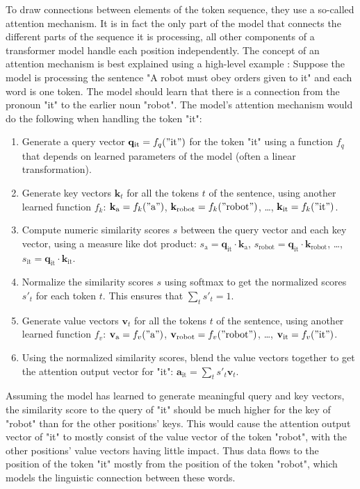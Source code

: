 To draw connections between elements of the token sequence, they use a so-called attention mechanism. It is in fact the only part of the model that connects the different parts of the sequence it is processing, all other components of a transformer model handle each position independently. The concept of an attention mechanism is best explained using a high-level example \cite{alammar-gpt2}: Suppose the model is processing the sentence "A robot must obey orders given to it" and each word is one token. The model should learn that there is a connection from the pronoun "it" to the earlier noun "robot".
The model's attention mechanism would do the following when handling the token "it":
\begin{enumerate}
	\item Generate a query vector $\mathbf{q}_{\mathrm{it}} = f_q("\mathrm{it}")$ for the token "it" using a function $f_q$ that depends on learned parameters of the model (often a linear transformation).
	\item Generate key vectors $\mathbf{k}_t$ for all the tokens $t$ of the sentence, using another learned function $f_k$: $\mathbf{k}_{\mathrm{a}} = f_k(\mathrm{"a"})$, $\mathbf{k}_{\mathrm{robot}} = f_k(\mathrm{"robot"})$, \ldots, $\mathbf{k}_{\mathrm{it}} = f_k(\mathrm{"it")}$.
	\item Compute numeric similarity scores $s$ between the query vector and each key vector, using a measure like dot product: $s_{\mathrm{a}} = \mathbf{\mathbf{q}}_{\mathrm{it}} \cdot \mathbf{k}_{\mathrm{a}}$, $s_{\mathrm{robot}} = \mathbf{q}_{\mathrm{it}} \cdot \mathbf{k}_{\mathrm{robot}}$, \ldots, $s_{\mathrm{it}} = \mathbf{q}_{\mathrm{it}} \cdot \mathbf{k}_{\mathrm{it}}$.
	\item Normalize the similarity scores $s$ using softmax to get the normalized scores $s'_t$ for each token $t$. This ensures that $\sum_t s'_t = 1$.
	\item Generate value vectors $\mathbf{v}_t$ for all the tokens $t$ of the sentence, using another learned function $f_v$: $\mathbf{v}_{\mathrm{a}} = f_v(\mathrm{"a"})$, $\mathbf{v}_{\mathrm{robot}} = f_v(\mathrm{"robot"})$, \ldots, $\mathbf{v}_{\mathrm{it}} = f_v(\mathrm{"it")}$.
	\item Using the normalized similarity scores, blend the value vectors together to get the attention output vector for "it": $\mathbf{a}_{\mathrm{it}} = \sum_t s'_t \mathbf{v}_t$. 
\end{enumerate}

Assuming the model has learned to generate meaningful query and key vectors, the similarity score to the query of "it" should be much higher for the key of "robot" than for the other positions' keys. This would cause the attention output vector of "it" to mostly consist of the value vector of the token "robot", with the other positions' value vectors having little impact. Thus data flows to the position of the token "it" mostly from the position of the token "robot", which models the linguistic connection between these words.

